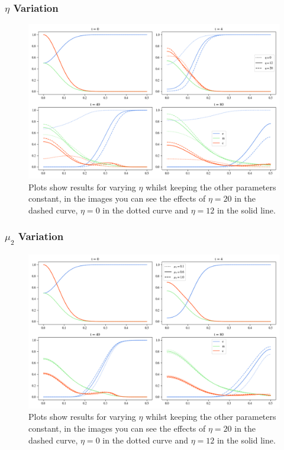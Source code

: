 \subsubsection*{$\eta$ Variation}
\begin{figure}[h]
    \centering
    \includegraphics[width=\textwidth]{resources/images/prolif_eta_variation.png}
    \caption{Plots show results for varying $\eta$ whilst keeping the other parameters constant, in the images you can see the effects of $\eta=20$ in the dashed curve, $\eta=0$ in the dotted curve and $\eta=12$ in the solid line.}
    \label{fig:eta_variation}
\end{figure}


\subsubsection*{$\mu_2$ Variation}
\begin{figure}[h]
    \centering
    \includegraphics[width=\textwidth]{resources/images/prolif_mu_2_variation.png}
    \caption{Plots show results for varying $\eta$ whilst keeping the other parameters constant, in the images you can see the effects of $\eta=20$ in the dashed curve, $\eta=0$ in the dotted curve and $\eta=12$ in the solid line.}
    \label{fig:eta_variation}
\end{figure}

